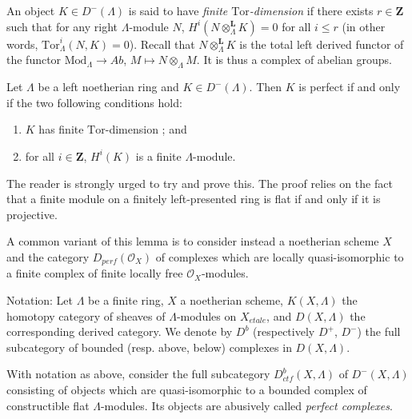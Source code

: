 \begin{definition}
\label{definition-finite-tor-dimension}
An object $K\in D^-(\Lambda)$ is said to have
{\it finite $\text{Tor}$-dimension}
if there exists $r\in \mathbf{Z}$ such that for any
right $\Lambda$-module $N$, $H^i(N\otimes_{\Lambda}^\mathbf{L} K) = 0$ for all
$i \leq r$ (in other words, $\text{Tor}^i_\Lambda (N, K) = 0$). Recall that
$N\otimes^\mathbf{L}_{\Lambda}K$ is the total left derived functor of the
functor $\text{Mod}_{\Lambda} \to \textit{Ab}$,
$M \mapsto N\otimes_{\Lambda} M$.
It is thus a complex of abelian groups.
\end{definition}

\begin{lemma}
\label{lemma-characterize-perfect}
Let $\Lambda$ be a left noetherian ring and $K\in D^-(\Lambda)$. Then $K$ is
perfect if and only if the two following conditions hold:
\begin{enumerate}
\item
$K$ has finite $\text{Tor}$-dimension ; and
\item
for all $i \in \mathbf{Z}$, $H^i(K)$ is a finite $\Lambda$-module.
\end{enumerate}
\end{lemma}

\noindent
The reader is strongly urged to try and prove this. The proof relies on the
fact that a finite module on a finitely left-presented ring is flat if and only
if it is projective.

\begin{remark}
\label{remark-variant}
A common variant of this lemma is to consider instead a noetherian scheme $X$
and the category $D_{perf}(\mathcal{O}_X)$ of complexes which are locally
quasi-isomorphic to a finite complex of finite locally free
$\mathcal{O}_X$-modules.
\end{remark}

\noindent
Notation: Let $\Lambda$ be a finite ring, $X$ a noetherian scheme,
$K(X, \Lambda)$ the
homotopy category of sheaves of $\Lambda$-modules on $X_{etale}$, and
$D(X, \Lambda)$ the corresponding derived category. We denote by $D^b$
(respectively $D^+$, $D^-$) the full subcategory of bounded
(resp. above, below) complexes in $D(X, \Lambda)$.

\begin{definition}
\label{definition-ctf}
With notation as above,
consider the full subcategory $D_{ctf}^b (X, \Lambda)$ of $D^-(X, \Lambda)$
consisting of objects which are quasi-isomorphic to a bounded complex of
constructible flat $\Lambda$-modules. Its objects are abusively called
{\it perfect complexes}.
\end{definition}

